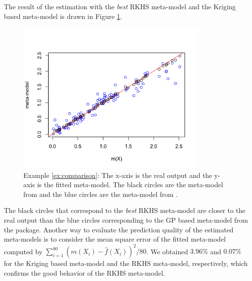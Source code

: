 The result of the estimation with the \textit{best} RKHS meta-model and the Kriging based meta-model is drawn in Figure \ref{comppred}.   
\begin{figure}[h!]
  \centering
  \includegraphics[width=9.5cm]{comppred.png}
  \caption{Example \ref{ex:comparison}: The x-axis is the real output and the y-axis is the fitted meta-model. The black circles are the meta-model from  and the blue circles are the meta-model from .}
  \label{comppred}
\end{figure}
The black circles that correspond to the \textit{best} RKHS meta-model are closer to the real output than the blue circles corresponding to the GP based meta-model from the  package. Another way to evaluate the prediction quality of the estimated meta-models is to  consider the mean square error of the fitted meta-model computed by $\sum_{i=1}^{80}(m(X_i)-\widehat{f}(X_i))^2/80$. We obtained $3.96\%$ and $0.07\%$ for the Kriging based meta-model and the RKHS meta-model, respectively, which confirms the good behavior of the RKHS meta-model. 

